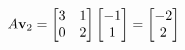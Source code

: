 \documentclass[preview]{standalone}
\begin{document}
\begin{align*}
\special{dvisvgm:raw <g id='unique000'>}A\mathbf{v}_2 = \begin{bmatrix}3&1\\0&2\end{bmatrix}\begin{bmatrix}-1\\1\end{bmatrix} = \begin{bmatrix}-2\\2\end{bmatrix}\special{dvisvgm:raw </g>}
\end{align*}
\end{document}
